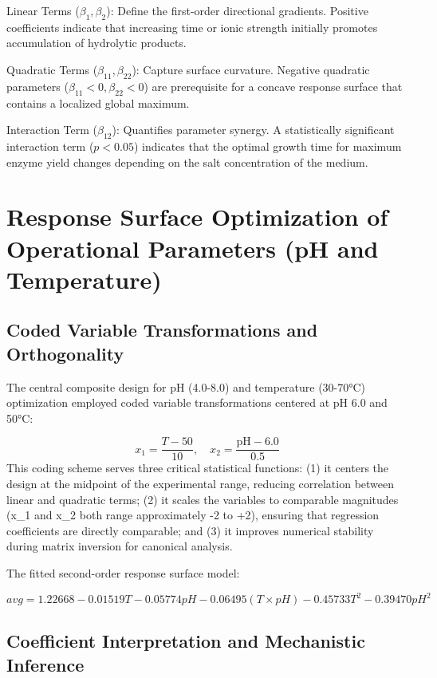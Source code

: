 \documentclass[
  12pt,
]{article}
\begin{document}
Linear Terms (\(\beta_1, \beta_2\)): Define the first-order directional
gradients. Positive coefficients indicate that increasing time or ionic
strength initially promotes accumulation of hydrolytic products.

Quadratic Terms (\(\beta_{11}, \beta_{22}\)): Capture surface curvature.
Negative quadratic parameters (\(\beta_{11} < 0, \beta_{22} < 0\)) are
prerequisite for a concave response surface that contains a localized
global maximum.

Interaction Term (\(\beta_{12}\)): Quantifies parameter synergy. A
statistically significant interaction term (\(p < 0.05\)) indicates that
the optimal growth time for maximum enzyme yield changes depending on
the salt concentration of the medium.

\section{Response Surface Optimization of Operational Parameters (pH and
Temperature)}\label{response-surface-optimization-of-operational-parameters-ph-and-temperature}

\subsection{Coded Variable Transformations and
Orthogonality}\label{coded-variable-transformations-and-orthogonality}

The central composite design for pH (4.0-8.0) and temperature (30-70°C)
optimization employed coded variable transformations centered at pH 6.0
and 50°C:

\[x_1 = \frac{T - 50}{10}, \quad x_2 = \frac{\text{pH} - 6.0}{0.5}\]
This coding scheme serves three critical statistical functions: (1) it
centers the design at the midpoint of the experimental range, reducing
correlation between linear and quadratic terms; (2) it scales the
variables to comparable magnitudes (x\_1 and x\_2 both range
approximately -2 to +2), ensuring that regression coefficients are
directly comparable; and (3) it improves numerical stability during
matrix inversion for canonical analysis.

The fitted second-order response surface model:

\[avg = 1.22668 - 0.01519 T - 0.05774 pH - 0.06495 (T \times pH) - 0.45733 T^2 - 0.39470 pH^2\]

\subsection{Coefficient Interpretation and Mechanistic
Inference}\label{coefficient-interpretation-and-mechanistic-inference}
\end{document}
